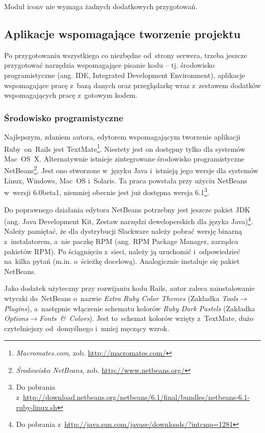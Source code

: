 \documentclass[a4paper,12pt,oneside]{report}
\begin{document}
Moduł iconv nie wymaga żadnych dodatkowych przygotowań.

\subsection{Aplikacje wspomagające tworzenie projektu}
\label{sub:ide}
Po przygotowaniu wszystkiego co niezbędne od~strony serwera, trzeba jeszcze przygotować narzędzia wspomagające pisanie kodu -- tj. środowisko programistyczne (ang. IDE, Integrated Development Environment), aplikacje wspomagające pracę z~bazą danych oraz przeglądarkę wraz z~zestawem dodatków wspomagających pracę z~gotowym kodem.

\subsubsection{Środowisko programistyczne}
\label{subsub:ide}
Najlepszym, zdaniem autora, edytorem wspomagającym tworzenie aplikacji Ruby~on~Rails jest TextMate\footnote{\emph{Macromates.com}, zob. \url{http://macromates.com/}}. Niestety jest on dostępny tylko dla systemów Mac~OS~X. Alternatywnie istnieje zintegrowane środowisko programistyczne NetBeans\footnote{\emph{Środowisko NetBeans}, zob. \url{http://www.netbeans.org/}}. Jest ono stworzone w~języku Java i~istnieją jego wersje dla systemów Linux, Windows, Mac~OS i~Solaris. Ta praca powstała przy użyciu NetBeans w~wersji 6.0beta1, niemniej obecnie jest już dostępna wersja 6.1\footnote{Do pobrania z~\url{http://download.netbeans.org/netbeans/6.1/final/bundles/netbeans-6.1-ruby-linux.sh}}.

Do poprawnego działania edytora NetBeans potrzebny jest jeszcze pakiet JDK (ang. Java Development Kit, Zestaw narzędzi deweloperskich dla języka Java)\footnote{Do pobrania z~\url{http://java.sun.com/javase/downloads/?intcmp=1281}}. Należy pamiętać, że dla dystrybucji Slackware należy pobrać wersję binarną z~instalatorem, a~nie paczkę RPM (ang. RPM Package Manager, zarządca pakietów RPM). Po ściągnięciu z~sieci, należy ją uruchomić i~odpowiedzieć na~kilka pytań (m.in. o~ścieżkę docelową). Analogicznie instaluje się pakiet NetBeans.

Jako dodatek użyteczny przy rozwijaniu kodu Rails, autor zaleca zainstalowanie wtyczki do~NetBeans o~nazwie \emph{Extra Ruby Color Themes} (Zakładka \emph{Tools}$\to$\emph{Plugins}), a~następnie włączenie schematu kolorów \emph{Ruby Dark Pastels} (Zakładka \emph{Options}$\to$\emph{Fonts~\&~Colors}). Jest to~schemat kolorów wzięty z~TextMate, dużo czytelniejszy od~domyślnego i~mniej męczący wzrok.
\end{document}
